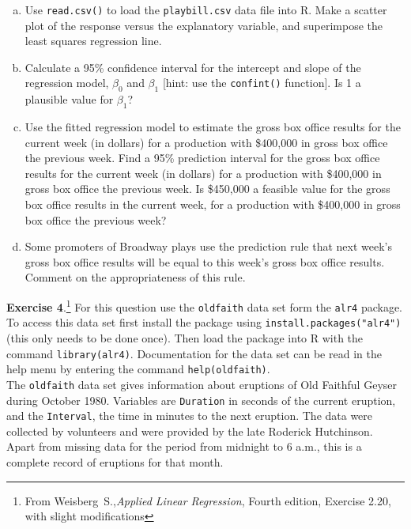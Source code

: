 \documentclass[11pt]{article}\usepackage[]{graphicx}\usepackage[]{color}
\begin{document}
\begin{enumerate}[(a)]
\item Use \texttt{read.csv()} to load the \texttt{playbill.csv} data file into R. Make a scatter plot of the response versus the explanatory variable, and superimpose the least squares regression line.
\item Calculate a 95\% confidence interval for the intercept and slope of the regression model, $\beta_0$ and $\beta_1$ [hint: use the \texttt{confint()} function]. Is 1 a plausible value for $\beta_1$?  
\item Use the fitted regression model to estimate the gross box office results for the current week (in dollars) for a production with \$400,000 in gross box office the previous week. Find a 95\% prediction interval for the gross box office results for the current week (in dollars) for a production with \$400,000 in gross box office the previous week. Is \$450,000 a feasible value for the gross box office results in the current week, for a production with \$400,000 in gross box office the previous week?
\item Some promoters of Broadway plays use the prediction rule that next week’s gross box office results will be equal to this week’s gross box office results. Comment on the appropriateness of this rule.
\end{enumerate}
\vspace{10pt}

\textbf{Exercise 4}.\footnote{From Weisberg~S.,\emph{Applied Linear Regression}, Fourth edition, Exercise 2.20, with slight modifications} For this question use the \texttt{oldfaith} data set form the \texttt{alr4} package.  To access this data set first install the package using \texttt{install.packages("alr4")} (this only needs to be done once).  Then load the package into R with the command \texttt{library(alr4)}.  Documentation for the data set can be read in the help menu by entering the command \texttt{help(oldfaith)}.\\

The \texttt{oldfaith} data set gives information about eruptions of Old Faithful Geyser during October 1980.  Variables are \texttt{Duration} in seconds of the current eruption, and the \texttt{Interval}, the time in minutes to the next eruption.  The data were collected by volunteers and were provided by the late Roderick Hutchinson.  Apart from missing data for the period from midnight to 6 a.m., this is a complete record of eruptions for that month.\\
\end{document}
